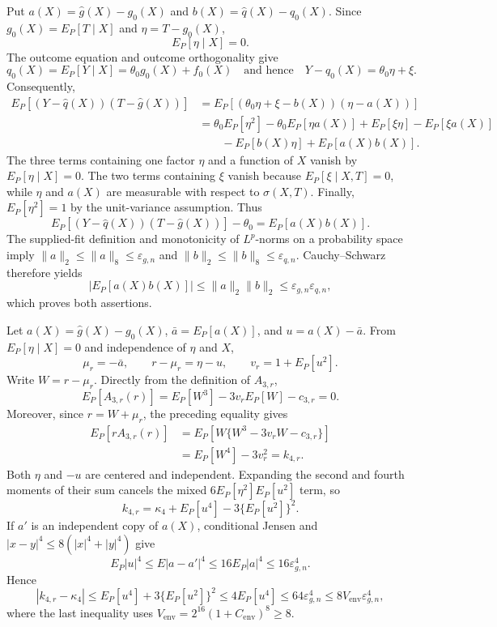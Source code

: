 Put \(a(X)=\widehat g(X)-g_0(X)\) and \(b(X)=\widehat q(X)-q_0(X)\).  Since \(g_0(X)=E_P[T\mid X]\) and \(\eta=T-g_0(X)\),
\[
E_P[\eta\mid X]=0.
\]
The outcome equation and outcome orthogonality give
\[
q_0(X)=E_P[Y\mid X]=\theta_0g_0(X)+f_0(X)
\quad\text{and hence}\quad
Y-q_0(X)=\theta_0\eta+\xi.
\]
Consequently,
\[
\begin{aligned}
E_P[(Y-\widehat q(X))(T-\widehat g(X))]
&=E_P[(\theta_0\eta+\xi-b(X))(\eta-a(X))]\\
&=\theta_0E_P[\eta^2]-\theta_0E_P[\eta a(X)]
  +E_P[\xi\eta]-E_P[\xi a(X)]\\
&\hspace{2em}-E_P[b(X)\eta]+E_P[a(X)b(X)].
\end{aligned}
\]
The three terms containing one factor \(\eta\) and a function of \(X\) vanish by \(E_P[\eta\mid X]=0\).  The two terms containing \(\xi\) vanish because \(E_P[\xi\mid X,T]=0\), while \(\eta\) and \(a(X)\) are measurable with respect to \(\sigma(X,T)\).  Finally, \(E_P[\eta^2]=1\) by the unit-variance assumption.  Thus
\[
E_P[(Y-\widehat q(X))(T-\widehat g(X))]-\theta_0=E_P[a(X)b(X)].
\]
The supplied-fit definition and monotonicity of \(L^p\)-norms on a probability space imply \(\lVert a\rVert_2\le\lVert a\rVert_8\le\varepsilon_{g,n}\) and \(\lVert b\rVert_2\le\lVert b\rVert_8\le\varepsilon_{q,n}\).  Cauchy--Schwarz therefore yields
\[
\left|E_P[a(X)b(X)]\right|
\le \lVert a\rVert_2\lVert b\rVert_2
\le\varepsilon_{g,n}\varepsilon_{q,n},
\]
which proves both assertions.

Let \(a(X)=\widehat g(X)-g_0(X)\), \(\bar a=E_P[a(X)]\), and \(u=a(X)-\bar a\).  From \(E_P[\eta\mid X]=0\) and independence of \(\eta\) and \(X\),
\[
\mu_r=-\bar a,
\qquad r-\mu_r=\eta-u,
\qquad v_r=1+E_P[u^2].
\]
Write \(W=r-\mu_r\).  Directly from the definition of \(A_{3,r}\),
\[
E_P[A_{3,r}(r)]
=E_P[W^3]-3v_rE_P[W]-c_{3,r}=0.
\]
Moreover, since \(r=W+\mu_r\), the preceding equality gives
\[
\begin{aligned}
E_P[rA_{3,r}(r)]
&=E_P[W\{W^3-3v_rW-c_{3,r}\}]\\
&=E_P[W^4]-3v_r^2=k_{4,r}.
\end{aligned}
\]
Both \(\eta\) and \(-u\) are centered and independent.  Expanding the second and fourth moments of their sum cancels the mixed \(6E_P[\eta^2]E_P[u^2]\) term, so
\[
k_{4,r}=\kappa_4+E_P[u^4]-3\{E_P[u^2]\}^2.
\]
If \(a'\) is an independent copy of \(a(X)\), conditional Jensen and \(|x-y|^4\le8(|x|^4+|y|^4)\) give
\[
E_P|u|^4\le E|a-a'|^4\le16E_P|a|^4\le16\varepsilon_{g,n}^4.
\]
Hence
\[
|k_{4,r}-\kappa_4|
\le E_P[u^4]+3\{E_P[u^2]\}^2
\le4E_P[u^4]
\le64\varepsilon_{g,n}^4
\le8V_{\mathrm{env}}\varepsilon_{g,n}^4,
\]
where the last inequality uses \(V_{\mathrm{env}}=2^{16}(1+C_{\mathrm{env}})^8\ge8\).

